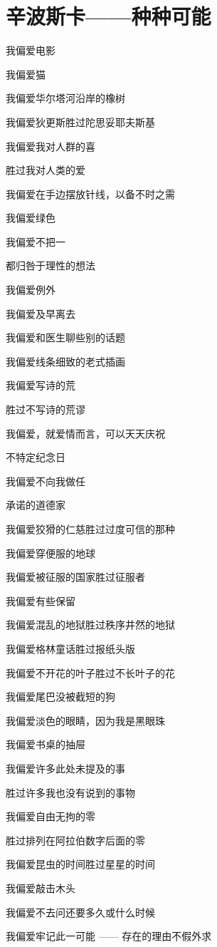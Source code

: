 \section{辛波斯卡——种种可能}

我偏爱电影

我偏爱猫

我偏爱华尔塔河沿岸的橡树

我偏爱狄更斯胜过陀思妥耶夫斯基

我偏爱我对人群的喜

胜过我对人类的爱

我偏爱在手边摆放针线，以备不时之需

我偏爱绿色

我偏爱不把一

都归咎于理性的想法

我偏爱例外

我偏爱及早离去

我偏爱和医生聊些别的话题

我偏爱线条细致的老式插画

我偏爱写诗的荒

胜过不写诗的荒谬

我偏爱，就爱情而言，可以天天庆祝

不特定纪念日

我偏爱不向我做任

承诺的道德家

我偏爱狡猾的仁慈胜过过度可信的那种

我偏爱穿便服的地球

我偏爱被征服的国家胜过征服者

我偏爱有些保留

我偏爱混乱的地狱胜过秩序井然的地狱

我偏爱格林童话胜过报纸头版

我偏爱不开花的叶子胜过不长叶子的花

我偏爱尾巴没被截短的狗

我偏爱淡色的眼睛，因为我是黑眼珠

我偏爱书桌的抽屉

我偏爱许多此处未提及的事

胜过许多我也没有说到的事物

我偏爱自由无拘的零

胜过排列在阿拉伯数字后面的零

我偏爱昆虫的时间胜过星星的时间

我偏爱敲击木头

我偏爱不去问还要多久或什么时候

我偏爱牢记此一可能 —— 存在的理由不假外求